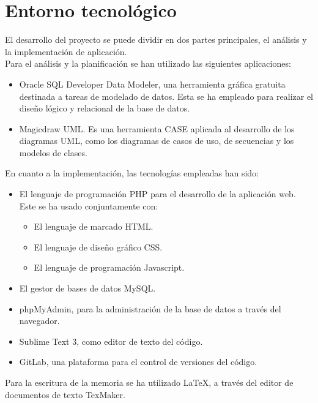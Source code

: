 \chapter{Entorno tecnol\'ogico}

El desarrollo del proyecto se puede dividir en dos partes principales, el análisis y la implementación de aplicación. \\

Para el análisis y la planificación se han utilizado las siguientes aplicaciones:
\begin{itemize}
	\item Oracle SQL Developer Data Modeler, una herramienta gráfica gratuita destinada a tareas de modelado de datos. Esta se ha empleado para realizar el diseño lógico y relacional de la base de datos.
	\item Magicdraw UML. Es una herramienta CASE aplicada al desarrollo de los diagramas UML, como los diagramas de casos de uso, de secuencias y los modelos de clases.
\end{itemize}

En cuanto a la implementación, las tecnologías empleadas han sido:
\begin{itemize}
	\item El lenguaje de programación PHP para el desarrollo de la aplicación web. Este se ha usado conjuntamente con:
		\begin{itemize}
			\item El lenguaje de marcado HTML.
			\item El lenguaje de diseño gráfico CSS.
			\item El lenguaje de programación Javascript.
		\end{itemize}
	\item El gestor de bases de datos MySQL.
	\item phpMyAdmin, para la administración de la base de datos a través del navegador.
	\item Sublime Text 3, como editor de texto del código.
	\item GitLab, una plataforma para el control de versiones del código.
\end{itemize}

Para la escritura de la memoria se ha utilizado LaTeX, a través del editor de documentos de texto TexMaker.
